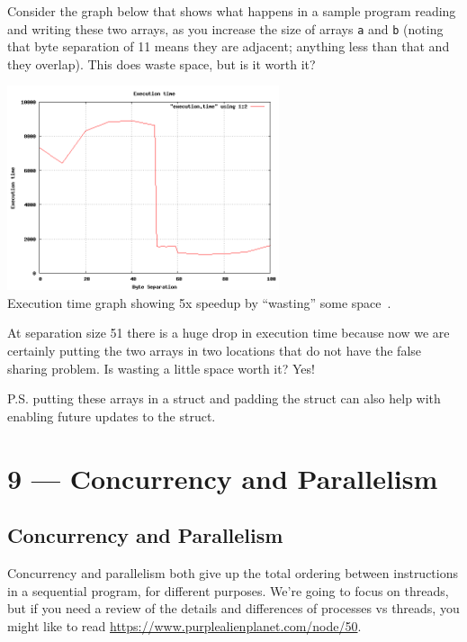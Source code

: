 \documentclass[a4paper]{report}
\begin{document}
Consider the graph below that shows what happens in a sample program reading and writing these two arrays, as you increase the size of arrays \texttt{a} and \texttt{b} (noting that byte separation of 11 means they are adjacent; anything less than that and they overlap). This does waste space, but is it worth it?

\begin{center}
\includegraphics[width=0.6\textwidth]{images/falsesharing.png}\\
Execution time graph showing 5x speedup by ``wasting'' some space~\cite{falsesharing}.
\end{center}

At separation size 51 there is a huge drop in execution time because now we are certainly putting the two arrays in two locations that do not have the false sharing problem. Is wasting a little space worth it? Yes!

P.S. putting these arrays in a struct and padding the struct can also help with enabling future updates to the struct.









\chapter*{9 --- Concurrency and Parallelism}


\section*{Concurrency and Parallelism}
Concurrency and parallelism both give up the
total ordering between instructions in a sequential program, for
different purposes. We're going to focus on threads, but if you need a review of the details and differences of processes vs threads, you might like to read   \url{https://www.purplealienplanet.com/node/50}. 
\end{document}
